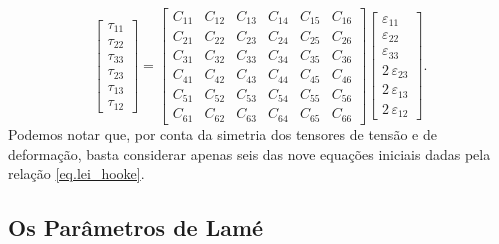 \begin{equation*}
\begin{bmatrix}
\tau_{11}\\
\tau_{22}\\
\tau_{33}\\
\tau_{23}\\
\tau_{13}\\
\tau_{12}
\end{bmatrix}=
\begin{bmatrix}
C_{11}&C_{12}&C_{13}&C_{14}&C_{15}&C_{16}\\
C_{21}&C_{22}&C_{23}&C_{24}&C_{25}&C_{26}\\
C_{31}&C_{32}&C_{33}&C_{34}&C_{35}&C_{36}\\
C_{41}&C_{42}&C_{43}&C_{44}&C_{45}&C_{46}\\
C_{51}&C_{52}&C_{53}&C_{54}&C_{55}&C_{56}\\
C_{61}&C_{62}&C_{63}&C_{64}&C_{65}&C_{66}
\end{bmatrix}
\begin{bmatrix}
\varepsilon_{11}\\
\varepsilon_{22}\\
\varepsilon_{33}\\
2\,\varepsilon_{23}\\
2\,\varepsilon_{13}\\
2\,\varepsilon_{12}
\end{bmatrix}.
\end{equation*}
Podemos notar que, por conta da simetria dos tensores de tens\~ao e de deforma\c{c}\~ao, basta considerar apenas seis das nove equa\c{c}\~oes iniciais dadas pela rela\c{c}\~ao \ref{eq.lei_hooke}.

\subsection{Os Par\^ametros de Lam\'e}

